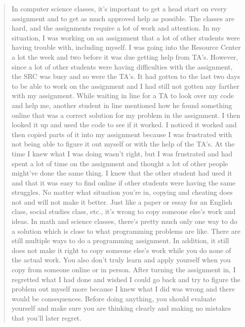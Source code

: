 \documentclass[12pt]{scrartcl}
\begin{document}
\begin{quote}
In computer science classes, it's important to get a head start on every assignment and to get as much approved help as possible.  The classes are hard, and the assignments require a lot of work and attention.  In my situation, I was working on an assignment that a lot of other students were having trouble with, including myself.  I was going into the Resource Center a lot the week and two before it was due getting help from TA's.  However, since a lot of other students were having difficulties with the assignment, the SRC was busy and so were the TA's.  It had gotten to the last two days to be able to work on the assignment and I had still not gotten any farther with my assignment.  While waiting in line for a TA to look over my code and help me, another student in line mentioned how he found something online that was a correct solution for my problem in the assignment.  I then looked it up and used the code to see if it worked.  I noticed it worked and then copied parts of it into my assignment because I was frustrated with not being able to figure it out myself or with the help of the TA's.
	At the time I knew what I was doing wasn't right, but I was frustrated and had spent a lot of time on the assignment and thought a lot of other people might've done the same thing.  I knew that the other student had used it and that it was easy to find online if other students were having the same struggles.  No matter what situation you're in, copying and cheating does not and will not make it better.  Just like a paper or essay for an English class, social studies class, etc., it's wrong to copy someone else's work and ideas.  In math and science classes, there's pretty much only one way to do a solution which is close to what programming problems are like.  There are still multiple ways to do a programming assignment.  In addition, it still does not make it right to copy someone else's work while you do none of the actual work.  You also don't truly learn and apply yourself when you copy from someone online or in person.  After turning the assignment in, I regretted what I had done and wished I could go back and try to figure the problem out myself more because I knew what I did was wrong and there would be consequences.  Before doing anything, you should evaluate yourself and make sure you are thinking clearly and making no mistakes that you'll later regret.

\end{quote}
\end{document}

